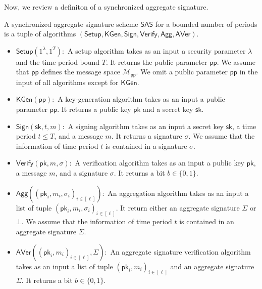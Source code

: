 \documentclass[a4paper,11pt]{fullverllncs}
\newcommand{\sk}{\mathsf{sk}}
\newcommand{\pk}{\mathsf{pk}}
\newcommand{\pp}{\mathsf{pp}}
\newcommand{\Setup}{\mathsf{Setup}}
\newcommand{\KGen}{\mathsf{KGen}}
\newcommand{\Sign}{\mathsf{Sign}}
\newcommand{\Verify}{\mathsf{Verify}}
\newcommand{\Agg}{\mathsf{Agg}}
\newcommand{\AVer}{\mathsf{AVer}}
\newcommand{\SAS}{\mathsf{SAS}}
\begin{document}
Now, we review a definiton of a synchronized aggregate signature.




\begin{definition} \label{SyncAggDef}
A synchronized aggregate signature scheme $\SAS$ for a bounded number of periods is a tuple of algorithms $(\Setup, \KGen,\allowbreak \Sign, \Verify,\allowbreak \Agg, \allowbreak \AVer)$.

\begin{itemize}
\item $\Setup(1^\lambda, 1^T): $ A setup algorithm takes as an input a security parameter $\lambda$ and the time period bound $T$.
It returns the public parameter $\pp$.
We assume that $\pp$ defines the message space $\mathcal{M}_{\pp}$.
We omit a public parameter $\pp$ in the input of all algorithms except for $\KGen$.

\item $\KGen (\pp):$ A key-generation algorithm takes as an input a public parameter $\pp$.
It returns a public key $\pk$ and a secret key $\sk$.

\item $\Sign (\sk, t, m):$ A signing algorithm takes as an input a secret key $\sk$, a time period $t \leq T$, and a message $m$.
It returns a signature $\sigma$.
We assume that the information of time period $t$ is contained in a signature $\sigma$.

\item $\Verify (\pk, m, \sigma):$ A verification algorithm takes as an input a public key $\pk$, a message $m$, and a signature $\sigma$.
It returns a bit $b \in \{0, 1\}$.

\item $\Agg ((\pk_i, m_i, \sigma_i)_{i \in [\ell]}):$
An aggregation algorithm takes as an input a list of tuple $(\pk_i, m_i, \sigma_i)_{i \in [\ell]}$.
It return either an aggregate signature $\Sigma$ or $\bot$.  
We assume that the information of time period $t$ is contained in an aggregate signature $\Sigma$.

\item $\AVer((\pk_i, m_i)_{i \in [\ell]}, \Sigma):$
An aggregate signature verification algorithm takes as an input a list of tuple $(\pk_i, m_i)_{i \in [\ell]}$ and an aggregate signature $\Sigma$.
It returns a bit $b \in \{0, 1\}$.
\end{itemize}

\end{definition}
\end{document}
